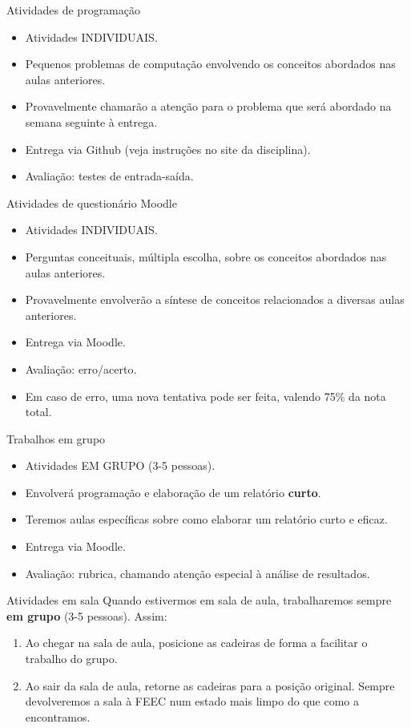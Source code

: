 \documentclass{beamer}
\begin{document}
\begin{frame}{Atividades de programação}
\Large
\begin{itemize}
\item Atividades INDIVIDUAIS.
\item Pequenos problemas de computação envolvendo os conceitos abordados nas aulas anteriores.
\item Provavelmente chamarão a atenção para o problema que será abordado na semana seguinte à entrega.
\item Entrega via Github (veja instruções no site da disciplina).
\item Avaliação: testes de entrada-saída.
\end{itemize}
\end{frame}

\begin{frame}{Atividades de questionário Moodle}
\Large
\begin{itemize}
\item Atividades INDIVIDUAIS.
\item Perguntas conceituais, múltipla escolha, sobre os conceitos abordados nas aulas anteriores.
\item Provavelmente envolverão a síntese de conceitos relacionados a diversas aulas anteriores.
\item Entrega via Moodle.
\item Avaliação: erro/acerto.
\item Em caso de erro, uma nova tentativa pode ser feita, valendo 75\% da nota total.
\end{itemize}
\end{frame}

\begin{frame}{Trabalhos em grupo}
\Large
\begin{itemize}
\item Atividades EM GRUPO (3-5 pessoas).
\item Envolverá programação e elaboração de um relatório \textbf{curto}.
\item Teremos aulas específicas sobre como elaborar um relatório curto e eficaz.
\item Entrega via Moodle.
\item Avaliação: rubrica, chamando atenção especial à análise de resultados.
\end{itemize}
\end{frame}

\begin{frame}{Atividades em sala}
\Large
Quando estivermos em sala de aula, trabalharemos sempre \textbf{em grupo} (3-5 pessoas). Assim:
\begin{enumerate}
\item Ao chegar na sala de aula, posicione as cadeiras de forma a facilitar o trabalho do grupo.
\item Ao sair da sala de aula, retorne as cadeiras para a posição original. Sempre devolveremos a sala à FEEC num estado mais limpo do que como a encontramos.
\end{enumerate}
\end{frame}
\end{document}
